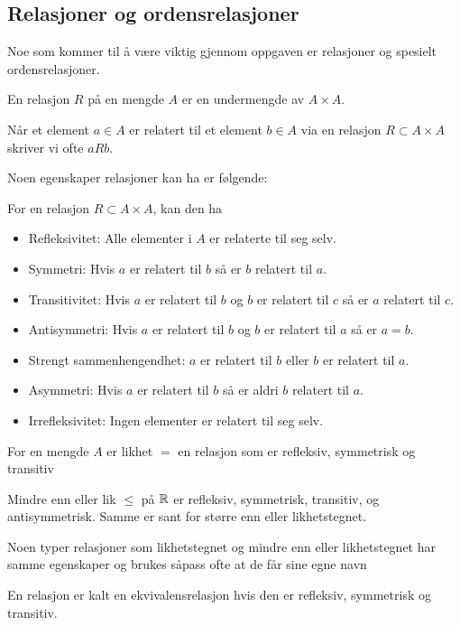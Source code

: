 \subsection{Relasjoner og ordensrelasjoner}
Noe som kommer til å være viktig gjennom oppgaven er relasjoner og spesielt ordensrelasjoner.
\begin{definisjon}\label{Def:label}
    En relasjon $R$ på en mengde $A$ er en undermengde av $A\times A$.
\end{definisjon}
Når et element $a\in A$ er relatert til et element $b\in A$ via en relasjon $R\subset A\times A$ skriver vi ofte $aRb$.

Noen egenskaper relasjoner kan ha er følgende:

For en relasjon $R\subset A\times A$, kan den ha
\begin{itemize}
    \item Refleksivitet: Alle elementer i $A$ er relaterte til seg selv.
    \item Symmetri: Hvis $a$ er relatert til $b$ så er $b$ relatert til $a$.
    \item Transitivitet: Hvis $a$ er relatert til $b$ og $b$ er relatert til $c$ så er $a$ relatert til $c$.
    \item Antisymmetri: Hvis $a$ er relatert til $b$ og $b$ er relatert til $a$ så er $a=b$.
    \item Strengt sammenhengendhet: $a$ er relatert til $b$ eller $b$ er relatert til $a$.
    \item Asymmetri: Hvis $a$ er relatert til $b$ så er aldri $b$ relatert til $a$.
    \item Irrefleksivitet: Ingen elementer er relatert til seg selv.
\end{itemize}

\begin{eksempel}\label{Ex:LikRel}
    For en mengde $A$ er likhet $=$ en relasjon som er refleksiv, symmetrisk og transitiv
\end{eksempel}

\begin{eksempel}\label{Ex:MinLikRel}
    Mindre enn eller lik $\leq$ på $\mathbb{R}$ er refleksiv, symmetrisk, transitiv, og antisymmetrisk. Samme er sant for større enn eller likhetstegnet.
\end{eksempel}

Noen typer relasjoner som likhetstegnet og mindre enn eller likhetstegnet har samme egenskaper og brukes såpass ofte at de får sine egne navn

\begin{definisjon}\label{Def:EkvivRel}
    En relasjon er kalt en ekvivalensrelasjon hvis den er refleksiv, symmetrisk og transitiv.
\end{definisjon}

